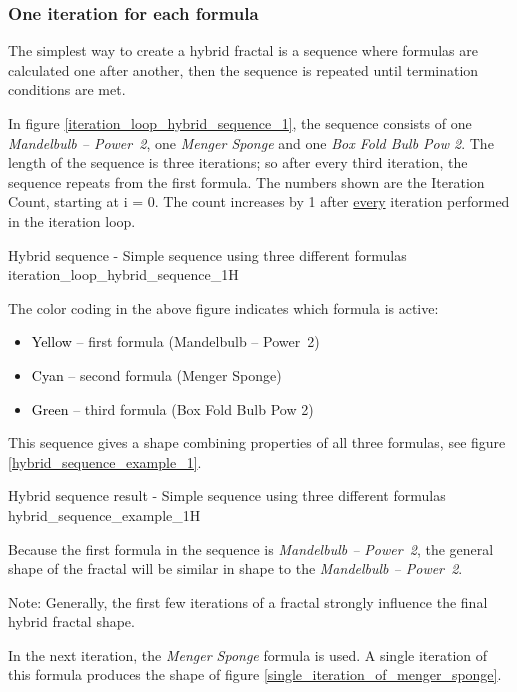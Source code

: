 \subsubsection{One iteration for each formula}

The simplest way to create a hybrid fractal is a sequence where formulas are calculated one after another, then the sequence is repeated until termination conditions are met.

In figure \ref{iteration_loop_hybrid_sequence_1}, the sequence consists of one \emph{Mandelbulb -- Power~2}, one \emph{Menger Sponge} and
one \emph{Box Fold Bulb Pow 2}. The length of the sequence is three iterations; so after every third iteration, the sequence repeats from the first formula. The numbers shown are the Iteration Count, starting at i = 0. The count increases by 1 after \underline{every} iteration performed in the iteration loop.

{Hybrid sequence - Simple sequence using three different formulas}
{iteration_loop_hybrid_sequence_1}{H}

The color coding in the above figure indicates which formula is active:
\begin{itemize}
	\item \textcolor{yellow}{\textcolor{black}{Yellow}} -- first formula (Mandelbulb -- Power~2)
	\item \textcolor{cyan}{\textcolor{black}{Cyan}} -- second formula (Menger Sponge)
	\item \textcolor{green}{\textcolor{black}{Green}} -- third formula (Box Fold Bulb Pow 2)
\end{itemize}

This sequence gives a shape combining properties of all three
formulas, see figure \ref{hybrid_sequence_example_1}.

{Hybrid sequence result - Simple sequence using three different formulas}
{hybrid_sequence_example_1}{H}

Because the first formula in the sequence is \emph{Mandelbulb -- Power~2}, the general shape
of the fractal will be similar in shape to the \emph{Mandelbulb -- Power~2}.

Note: Generally, the first few iterations of a fractal strongly influence the final hybrid fractal shape.

In the next iteration, the \emph{Menger Sponge} formula is used. A single iteration
of this formula produces the shape of figure \ref{single_iteration_of_menger_sponge}.


